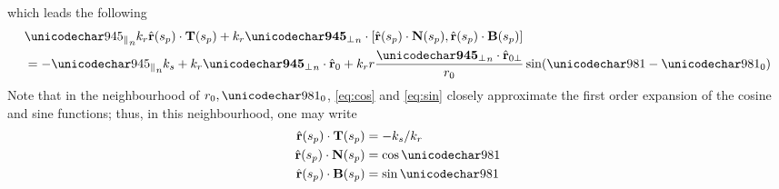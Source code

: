 which leads the following
\begin{equation}
 \begin{split}
  &\alongtrack\kr\vhat{\range}(\stationaryparm)\cdot\vct{T}(\stationaryparm) + \kr\acrosstrack\cdot[\vhat{\range}(\stationaryparm)\cdot\vct{N}(\stationaryparm), \vhat{\range}(\stationaryparm)\cdot\vct{B}(\stationaryparm)]\\
  &=-\alongtrack\kparm+\kr\acrosstrack\cdot\uRangeVectorParmZero+\kr\targetrange\frac{\acrosstrack\cdot\uRangeVectorParmZeroPerp}{\targetrangez}\sin(\targetdepression-\targetdepressionz)
 \end{split}
\end{equation}
Note that in the neighbourhood of $\targetrangez, \targetdepressionz$, \eqref{eq:cos} and \eqref{eq:sin} closely approximate the first order expansion of the cosine and sine functions; thus, in this neighbourhood, one may write
\begin{align}
 \vhat{\range}(\stationaryparm)\cdot\vct{T}(\stationaryparm) &= -\kparm/\kr\\
 \vhat{\range}(\stationaryparm)\cdot\vct{N}(\stationaryparm) &= \cos\targetdepression\label{eq:cossimp}\\
 \vhat{\range}(\stationaryparm)\cdot\vct{B}(\stationaryparm) &= \sin\targetdepression\label{eq:sinsimp}
\end{align}
